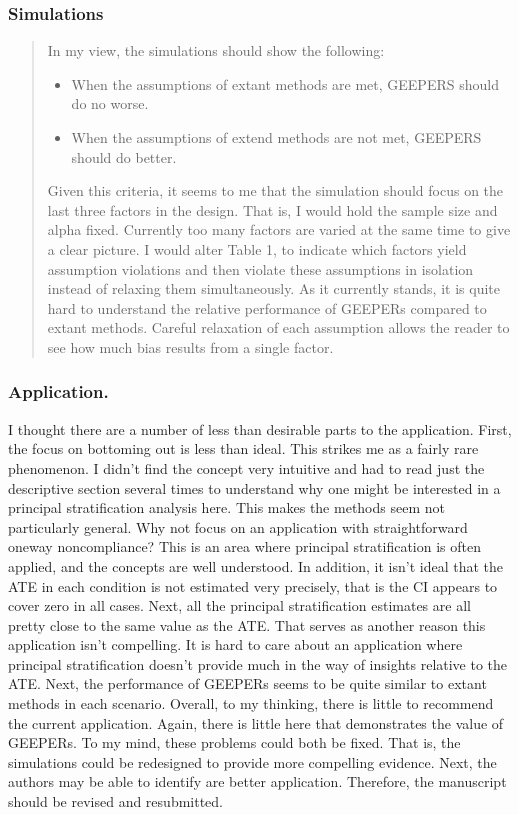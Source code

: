 \documentclass[]{article}
\begin{document}
\subsubsection{Simulations}
\begin{quote}
  In my view, the simulations should show the following:
  \begin{itemize}
    \item When the assumptions of extant methods are met, GEEPERS should do no worse.
    \item When the assumptions of extend methods are not met, GEEPERS
      should do better.
  \end{itemize}
Given this criteria, it seems to me that the simulation should focus on the last three factors in the design. That is, I would
hold the sample size and alpha fixed. Currently too many factors are varied at the same time to give a clear picture. I would
alter Table 1, to indicate which factors yield assumption violations and then violate these assumptions in isolation instead of
relaxing them simultaneously. As it currently stands, it is quite hard to understand the relative performance of GEEPERs
compared to extant methods. Careful relaxation of each assumption allows the reader to see how much bias results from a
single factor.
\end{quote}


\subsubsection{Application.}
I thought there are a number of less than desirable parts to the application. First, the focus on bottoming out is less than
ideal. This strikes me as a fairly rare phenomenon. I didn't find the concept very intuitive and had to read just the descriptive
section several times to understand why one might be interested in a principal stratification analysis here. This makes the
methods seem not particularly general. Why not focus on an application with straightforward oneway noncompliance? This
is an area where principal stratification is often applied, and the concepts are well understood.
In addition, it isn't ideal that the ATE in each condition is not estimated very precisely, that is the CI appears to cover zero in
all cases. Next, all the principal stratification estimates are all pretty close to the same value as the ATE. That serves as
another reason this application isn't compelling. It is hard to care about an application where principal stratification doesn't
provide much in the way of insights relative to the ATE. Next, the performance of GEEPERs seems to be quite similar to
extant methods in each scenario. Overall, to my thinking, there is little to recommend the current application. Again, there is
little here that demonstrates the value of GEEPERs.
To my mind, these problems could both be fixed. That is, the simulations could be redesigned to provide more compelling
evidence. Next, the authors may be able to identify are better application. Therefore, the manuscript should be revised and
resubmitted.
\end{document}
